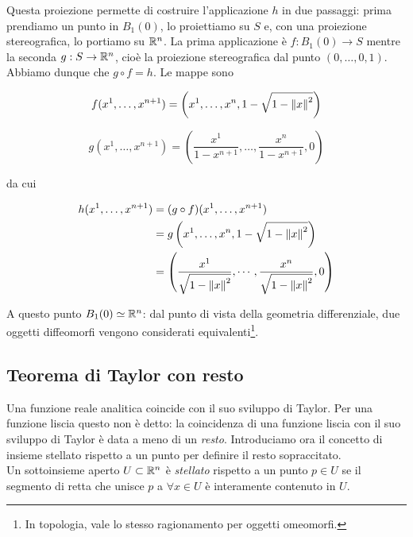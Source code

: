 Questa proiezione permette di costruire l'applicazione $ h $ in due passaggi: prima prendiamo un punto in $ B_{1}(0) $, lo proiettiamo su $ S $ e, con una proiezione stereografica, lo portiamo su $ \mathbb{R}^{n} $. La prima applicazione è $ f : B_{1}(0) \to S $ mentre la seconda $ g : S \to \mathbb{R}^{n} $, cioè la proiezione stereografica dal punto $ (0,\dots,0,1) $. Abbiamo dunque che $ g \circ f = h $. Le mappe sono

\begin{equation}
	f (x^{1},\dots,x^{n+1}) = \left( x^{1},\dots,x^{n},1-\sqrt{1-\norm{x}^{2}} \right)
\end{equation}

\begin{equation}
	g (x^{1},\dots,x^{n+1}) = \left( \dfrac{x^{1}}{1-x^{n+1}},\dots,\dfrac{x^{n}}{1-x^{n+1}},0 \right)
\end{equation}

da cui

\begin{align}
	\begin{split}
		h (x^{1},\dots,x^{n+1}) &= (g \circ f) (x^{1},\dots,x^{n+1})\\
		&= g \left( x^{1},\dots,x^{n},1-\sqrt{1-\norm{x}^{2}} \right)\\
		&= \left( \dfrac{x^{1}}{\sqrt{1 - \norm{x}^{2}}}, \cdots, \dfrac{x^{n}}{\sqrt{1 - \norm{x}^{2}}}, 0 \right)
	\end{split}
\end{align}

A questo punto $ B_{1} (0) \simeq \mathbb{R}^{n} $: dal punto di vista della geometria differenziale, due oggetti diffeomorfi vengono considerati equivalenti\footnote{%
	In topologia, vale lo stesso ragionamento per oggetti omeomorfi.}.

\subsection{Teorema di Taylor con resto}

Una funzione reale analitica coincide con il suo sviluppo di Taylor. Per una funzione liscia questo non è detto: la coincidenza di una funzione liscia con il suo sviluppo di Taylor è data a meno di un \textit{resto}. Introduciamo ora il concetto di insieme stellato rispetto a un punto per definire il resto sopraccitato.\\
Un sottoinsieme aperto $ U \subset \mathbb{R}^{n} $ è \textit{stellato} rispetto a un punto $ p \in U $ se il segmento di retta che unisce $ p $ a $ \forall x \in U $ è interamente contenuto in $ U $.

